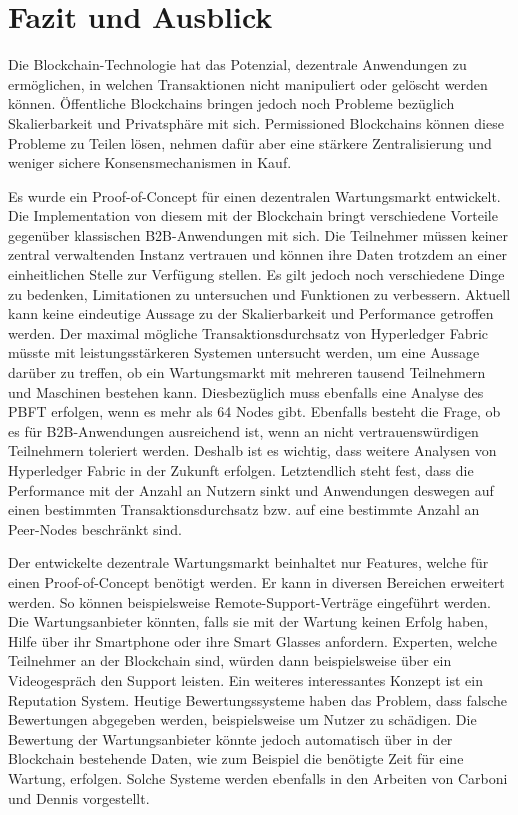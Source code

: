 \chapter{Fazit und Ausblick}
\label{cha:fazit}

Die Blockchain-Technologie hat das Potenzial, dezentrale Anwendungen zu ermöglichen, in welchen Transaktionen nicht manipuliert oder gelöscht werden können. Öffentliche Blockchains bringen jedoch noch Probleme bezüglich Skalierbarkeit und Privatsphäre mit sich. Permissioned Blockchains können diese Probleme zu Teilen lösen, nehmen dafür aber eine stärkere Zentralisierung und weniger sichere Konsensmechanismen in Kauf. 

Es wurde ein Proof-of-Concept für einen dezentralen Wartungsmarkt entwickelt. Die Implementation von diesem mit der Blockchain bringt verschiedene Vorteile gegenüber klassischen B2B-Anwendungen mit sich. Die Teilnehmer müssen keiner zentral verwaltenden Instanz vertrauen und können ihre Daten trotzdem an einer einheitlichen Stelle zur Verfügung stellen. Es gilt jedoch noch verschiedene Dinge zu bedenken, Limitationen zu untersuchen und Funktionen zu verbessern. Aktuell kann keine eindeutige Aussage zu der Skalierbarkeit und Performance getroffen werden. Der maximal mögliche Transaktionsdurchsatz von Hyperledger Fabric müsste mit leistungsstärkeren Systemen untersucht werden, um eine Aussage darüber zu treffen, ob ein Wartungsmarkt mit mehreren tausend Teilnehmern und Maschinen bestehen kann. Diesbezüglich muss ebenfalls eine Analyse des \acs{PBFT} erfolgen, wenn es mehr als 64 Nodes gibt. Ebenfalls besteht die Frage, ob es für B2B-Anwendungen ausreichend ist, wenn  an nicht vertrauenswürdigen Teilnehmern toleriert werden. Deshalb ist es wichtig, dass weitere Analysen von Hyperledger Fabric in der Zukunft erfolgen. Letztendlich steht fest, dass die Performance mit der Anzahl an Nutzern sinkt und Anwendungen deswegen auf einen bestimmten Transaktionsdurchsatz bzw. auf eine bestimmte Anzahl an Peer-Nodes beschränkt sind. 

Der entwickelte dezentrale Wartungsmarkt beinhaltet nur Features, welche für einen Proof-of-Concept benötigt werden. Er kann in diversen Bereichen erweitert werden. So können beispielsweise Remote-Support-Verträge eingeführt werden. Die Wartungsanbieter könnten, falls sie mit der Wartung keinen Erfolg haben, Hilfe über ihr Smartphone oder ihre Smart Glasses anfordern. Experten, welche Teilnehmer an der Blockchain sind, würden dann beispielsweise über ein Videogespräch den Support leisten. Ein weiteres interessantes Konzept ist ein Reputation System. Heutige Bewertungssysteme haben das Problem, dass falsche Bewertungen abgegeben werden, beispielsweise um Nutzer zu schädigen. Die Bewertung der Wartungsanbieter könnte jedoch automatisch über in der Blockchain bestehende Daten, wie zum Beispiel die benötigte Zeit für eine Wartung, erfolgen. Solche Systeme werden ebenfalls in den Arbeiten von Carboni \cite{CarboniFeedbackbasedReputation2015} und Dennis \cite{DennisRepblocknext2015} vorgestellt.

